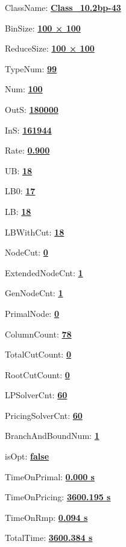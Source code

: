 \documentclass[11pt]{article}
\begin{document}
\pagestyle{empty}


ClassName: \underline{\textbf{Class_10.2bp-43}}
\par
BinSize: \underline{\textbf{100 × 100}}
\par
ReduceSize: \underline{\textbf{100 × 100}}
\par
TypeNum: \underline{\textbf{99}}
\par
Num: \underline{\textbf{100}}
\par
OutS: \underline{\textbf{180000}}
\par
InS: \underline{\textbf{161944}}
\par
Rate: \underline{\textbf{0.900}}
\par
UB: \underline{\textbf{18}}
\par
LB0: \underline{\textbf{17}}
\par
LB: \underline{\textbf{18}}
\par
LBWithCut: \underline{\textbf{18}}
\par
NodeCut: \underline{\textbf{0}}
\par
ExtendedNodeCnt: \underline{\textbf{1}}
\par
GenNodeCnt: \underline{\textbf{1}}
\par
PrimalNode: \underline{\textbf{0}}
\par
ColumnCount: \underline{\textbf{78}}
\par
TotalCutCount: \underline{\textbf{0}}
\par
RootCutCount: \underline{\textbf{0}}
\par
LPSolverCnt: \underline{\textbf{60}}
\par
PricingSolverCnt: \underline{\textbf{60}}
\par
BranchAndBoundNum: \underline{\textbf{1}}
\par
isOpt: \underline{\textbf{false}}
\par
TimeOnPrimal: \underline{\textbf{0.000 s}}
\par
TimeOnPricing: \underline{\textbf{3600.195 s}}
\par
TimeOnRmp: \underline{\textbf{0.094 s}}
\par
TotalTime: \underline{\textbf{3600.384 s}}
\par
\newpage


\end{document}
